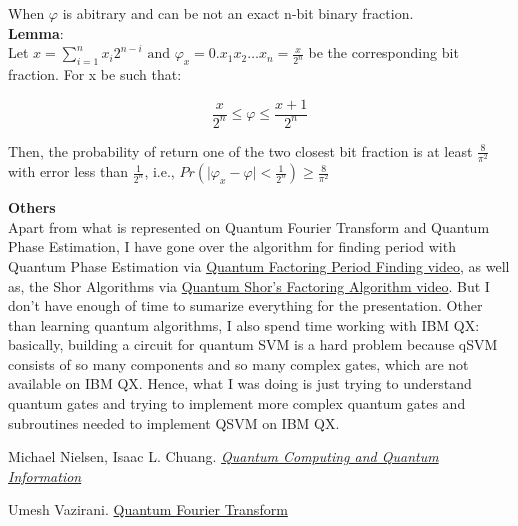 \documentclass[12pt]{article}
\begin{document}
When $\varphi$ is abitrary and can be not an exact n-bit binary fraction. \\

\textbf{Lemma}: \\

Let $x = \sum_{i = 1}^{n} x_{i} 2^{n-i} \text{ and } \varphi_{x} = 0.x_{1}x_{2} \dots x_{n} = \frac{x}{2^{n}}$ be the corresponding bit fraction. For x be such that:

$$ \frac{x}{2^n} \leq \varphi \leq \frac{x+1}{2^n}$$

Then, the probability of return one of the two closest bit fraction is at least $\frac{8}{\pi^{2}}$ with error less than $\frac{1}{2^{n}}$, i.e., $Pr(\vert \varphi_{x} - \varphi \vert < \frac{1}{2^{n}}) \geq \frac{8}{\pi^{2}}$

\textbf{\large Others} \\

Apart from what is represented on Quantum Fourier Transform and Quantum Phase Estimation, I have gone over the algorithm for finding period with Quantum Phase Estimation via \href{https://www.youtube.com/watch?v=crMM0tCboZU&index=44&list=PL2jykFOD1AWap0r8WOuZ-08BFgMyx-5RT&t=0s}{Quantum Factoring Period Finding video}, as well as, the Shor Algorithms via \href{https://www.youtube.com/watch?v=YhjKWAMFBUU&index=44&list=PL2jykFOD1AWap0r8WOuZ-08BFgMyx-5RT}{Quantum Shor's Factoring Algorithm video}. But I don't have enough of time to sumarize everything for the presentation. Other than learning quantum algorithms, I also spend time working with IBM QX: basically, building a circuit for quantum SVM is a hard problem because qSVM consists of so many components and so many complex gates, which are not available on IBM QX. Hence, what I was doing is just trying to understand quantum gates and trying to implement more complex quantum gates and subroutines needed to implement QSVM on IBM QX. 

\medbreak

\begin{thebibliography}{9}
Michael Nielsen, Isaac L. Chuang. 
\href{http://www-reynal.ensea.fr/docs/iq/QC10th.pdf}{\textit{Quantum Computing and Quantum Information}}

Umesh Vazirani. 
\href{https://www.youtube.com/watch?v=BM429cOogYc&list=PL2jykFOD1AWap0r8WOuZ-08BFgMyx-5RT&index=38}{Quantum Fourier Transform}


\end{thebibliography}
\end{document}
